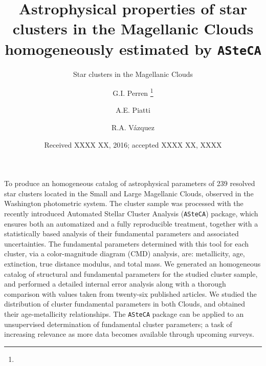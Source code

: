 \documentclass{aa}
\begin{document}
\title{Astrophysical properties of star clusters in the Magellanic Clouds
homogeneously estimated by \texttt{ASteCA}}
\subtitle{Star clusters in the Magellanic Clouds}

   \author{G.I. Perren
          \thanks{}
          \and
          A.E. Piatti
          \and
          R.A. V\'azquez
          }


   \date{Received XXXX XX, 2016; accepted XXXX XX, XXXX}

 
\abstract
{}
{To produce an homogeneous catalog of astrophysical parameters of 239 resolved
star clusters located in the Small and Large Magellanic Clouds, observed in the
Washington photometric system.}
{The cluster sample was processed with the recently introduced Automated
Stellar Cluster Analysis (\texttt{ASteCA}) package, which ensures both an
automatized and a fully reproducible treatment, together with a statistically
based analysis of their fundamental parameters and associated uncertainties.
%
The fundamental parameters determined with this tool for each cluster, via a
color-magnitude diagram (CMD) analysis, are: metallicity, age, extinction, true
distance modulus, and total mass.}
{We generated an homogeneous catalog of structural and fundamental parameters
for the studied cluster sample, and performed a detailed internal error analysis
along with a thorough comparison with values taken from twenty-six published
articles.
We studied the distribution of cluster fundamental parameters in both Clouds,
and obtained their age-metallicity relationships.}
{The \texttt{ASteCA} package can be applied to an unsupervised determination of
fundamental cluster parameters; a task of increasing relevance as more data
becomes available through upcoming surveys.}
\end{document}
